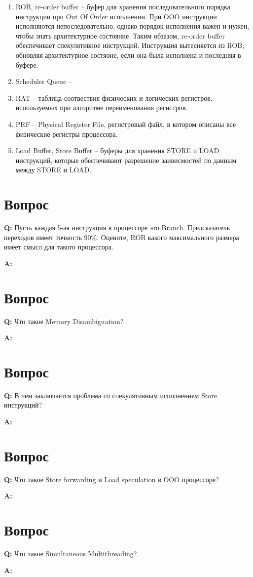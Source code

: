 \documentclass[12pt, letterpaper]{article}
\begin{document}
\begin{enumerate}
    \item ROB, re-order buffer -- буфер для хранения последовательного порядка инструкции при Out Of Order исполнении. При OOO инструкции исполняются непоследовательно, однако порядок исполнения важен и нужен, чтобы знать архитектурное состояние. Таким обзазом, re-order buffer обеспечивает спекулятивное инструкций. Инструкция вытесняется из ROB, обновляя архитектурное состяоне, если она была исполнена и последняя в буфере.
    \item Scheduler Queue --
    \item RAT -- таблица соотвествия физических и логических регистров, используемых при алгоритме переименования регистров.
    \item PRF -- Physical Register File, регистровый файл, в котором описаны все физические регистры процессора.
    \item Load Buffer, Store Buffer -- буферы для хранения STORE и LOAD инструкций, которые обеспечивают разрешение заивисмостей по данным между STORE и LOAD.
\end{enumerate}

\newpage

\section{Вопрос}

\textbf{Q: } Пусть каждая 5-ая инструкция в процессоре это Branch. Предсказатель
переходов имеет точность 90\%. Оцените, ROB какого максимального
размера имеет смысл для такого процессора.

\textbf{A: }

\newpage

\section{Вопрос}

\textbf{Q: }  Что такое Memory Disambiguation?

\textbf{A: }

\newpage

\section{Вопрос}

\textbf{Q: } В чем заключается проблема со спекулятивным исполнением Store
инструкций?

\textbf{A: }

\newpage

\section{Вопрос}

\textbf{Q: } Что такое Store forwarding и Load speculation в OOO процессоре?

\textbf{A: }

\newpage

\section{Вопрос}

\textbf{Q: } Что такое Simultaneous Multithreading?

\textbf{A: }

\newpage
\end{document}
